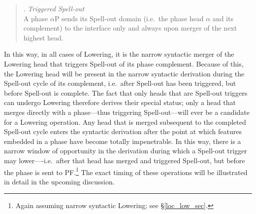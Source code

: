 \singlespacing
\begin{quote}
\begin{minipage}{5in}
\ex. {\it Triggered Spell-out}\\
A phase $\alpha$P sends its Spell-out domain (i.e.\ the phase head $\alpha$ and its complement) to the interface only and always upon merger of the next highest head.\footnotemark

\end{minipage}
\end{quote}
\onehalfspacing
In this way, in all cases of Lowering, it is the narrow syntactic merger of the Lowering head that triggers Spell-out of its phase complement. Because of this, the Lowering head will be present in the narrow syntactic derivation during the Spell-out cycle of its complement, i.e.\ after Spell-out has been triggered, but before Spell-out is complete. The fact that only heads that are Spell-out triggers can undergo Lowering therefore derives their special status; only a head that merges directly with a phase---thus triggering Spell-out---will ever be a candidate for a Lowering operation. Any head that is merged subsequent to the completed Spell-out cycle enters the syntactic derivation after the point at which features embedded in a phase have become totally impenetrable. In this way, there is a narrow window of opportunity in the derivation during which a Spell-out trigger may lower----i.e.\ after that head has merged and triggered Spell-out, but before the phase is sent to PF.\footnote{Again assuming narrow syntactic Lowering; see \S\ref{loc_low_sec}.} The exact timing of these operations will be illustrated in detail in the upcoming discussion.


